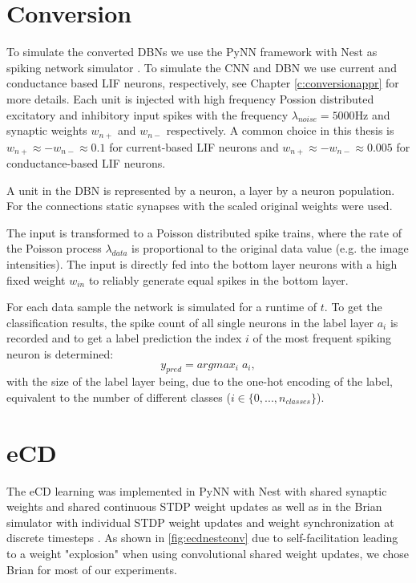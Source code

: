 \section{Conversion} \label{c:conversionimpl}

To simulate the converted DBNs we use the PyNN framework with Nest as spiking network simulator \cite{10.3389/neuro.11.011.2008}\cite{Gewaltig:NEST}.
To simulate the CNN and DBN we use current and conductance based LIF neurons, respectively, see Chapter \ref{c:conversionappr} for more details.
Each unit is injected with high frequency Possion distributed excitatory and inhibitory input spikes with the frequency $\lambda_{noise}= 5000 \text{Hz}$ and synaptic weights $w_{n+}$ and $w_{n-}$ respectively.
A common choice in this thesis is $w_{n+} \approx - w_{n-} \approx 0.1$ for current-based LIF neurons and  $w_{n+} \approx - w_{n-} \approx 0.005$ for conductance-based LIF neurons.

A unit in the DBN is represented by a neuron, a layer by a neuron population.
For the connections static synapses with the scaled original weights were used. 

The input is transformed to a Poisson distributed spike trains, where the rate of the Poisson process $\lambda_{data}$ is proportional to the original data value (e.g. the image intensities). 
The input is directly fed into the bottom layer neurons with a high fixed weight $w_{in}$ to reliably generate equal spikes in the bottom layer.    

For each data sample the network is simulated for a runtime of $t$. 
To get the classification results, the spike count of all single neurons in the label layer $a_i$ is recorded and to get a label prediction the index $i$ of the most frequent spiking neuron is determined:
\[
y_{pred} = argmax_i \; a_i,
\]
with the size of the label layer being, due to the one-hot encoding of the label, equivalent to the number of different classes ($i \in \{0,..., n_{classes}\}$). 

\section{eCD} \label{c:ecdimpl}

The eCD learning was implemented in PyNN with Nest with shared synaptic weights and shared continuous STDP weight updates as well as in the Brian simulator with individual STDP weight updates and weight synchronization at discrete timesteps \cite{10.3389/neuro.11.011.2008}\cite{Gewaltig:NEST}\cite{10.3389/neuro.11.005.2008}. 
As shown in \ref{fig:ecdnestconv} due to self-facilitation leading to a weight "explosion" when using convolutional shared weight updates, we chose Brian for most of our experiments.

